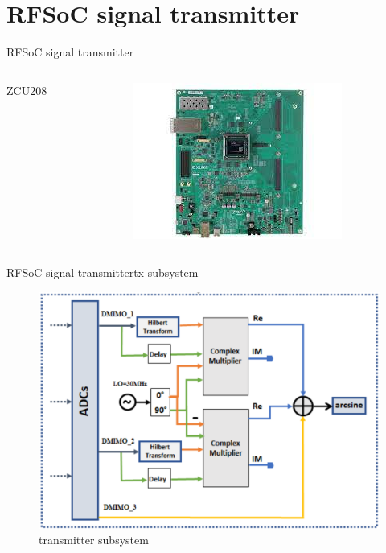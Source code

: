 \section{RFSoC signal transmitter}
\begin{frame}{RFSoC signal transmitter}{}
	\begin{columns}
		\begin{column}{0.4\textwidth}
			\begin{block}{ZCU208}
			\end{block}
		\end{column}
		\begin{column}{0.6\textwidth}
			\begin{center}
				\includegraphics[scale=0.65]{graphics/zcu208.jpeg}
			\end{center}
		\end{column}
	\end{columns}
\end{frame}
\begin{frame}{RFSoC signal transmitter}{tx-subsystem}
	\begin{figure}
		\centering
		\includegraphics[scale=1]{graphics/tx_ss.png}
		\caption{transmitter subsystem}
	\end{figure}
\end{frame}
